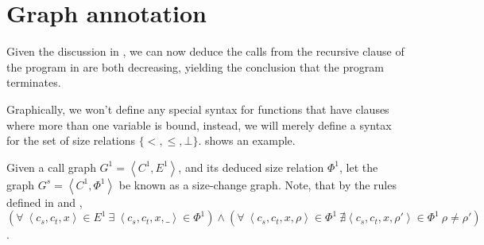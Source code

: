\section{Graph annotation}

Given the discussion in , we can now
deduce the calls from the recursive clause of the program in
 are both decreasing, yielding the conclusion that
the program  terminates.

Graphically, we won't define any special syntax for functions that have clauses
where more than one variable is bound, instead, we will merely define a syntax
for the set of size relations $\{<,\leq,\bot\}$. 
shows an example.

\begin{definition} Given a call graph $G^1 = \left\langle C^1, E^1
\right\rangle$, and its deduced size relation $\Phi^1$, let the graph $G^s =
\left\langle C^1, \Phi^1 \right\rangle$ be known as a size-change graph. Note,
that by the rules defined in  and
, $\left(\forall\ \left\langle c_s, c_t, x
\right\rangle \in E^1\ \exists\ \left\langle c_s, c_t, x, \_ \right\rangle \in
\Phi^1\right) \wedge \left(\forall\ \left\langle c_s, c_t, x, \rho
\right\rangle \in \Phi^1\ \nexists \left\langle c_s, c_t, x, \rho'
\right\rangle \in \Phi^1\ \rho\neq\rho' \right)$.\end{definition}

